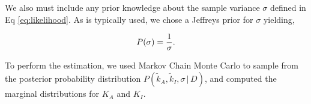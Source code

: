 \documentclass[letterpaper, 10pt]{article}
\begin{document}
We also must include any prior knowledge about the sample variance $\sigma$ defined
in Eq \ref{eq:likelihood}. As is typically used, we chose a Jeffreys prior \cite{Sivia2006}
for $\sigma$ yielding,

\begin{equation}
  P(\sigma) = {1 \over \sigma}.
  \label{eq:Jeffreys}
\end{equation}

To perform the estimation, we used Markov Chain Monte Carlo to sample from the
posterior probability distribution $P(\tilde{k}_A, \tilde{k}_I, \sigma\,\vert\, D)$,
and computed the marginal distributions for $K_A$ and $K_I$.


\printbibliography
\end{document}
